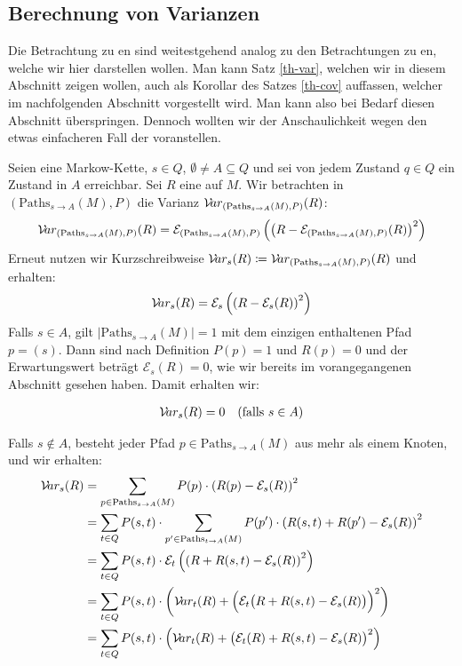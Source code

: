 \documentclass[a4paper]{article}
\newcommand{\mc}{Markow-Kette}
\theoremstyle{nonumberplain}
\begin{document}
\subsection{Berechnung von Varianzen}

Die Betrachtung zu \cov{}en sind weitestgehend analog zu den Betrachtungen zu \var{}en, welche wir hier darstellen wollen. Man kann Satz \ref{th-var}, welchen wir in diesem Abschnitt zeigen wollen, auch als Korollar des Satzes \ref{th-cov} auffassen, welcher im nachfolgenden Abschnitt vorgestellt wird. Man kann also bei Bedarf diesen Abschnitt überspringen. Dennoch wollten wir der Anschaulichkeit wegen den etwas einfacheren Fall der \var{} voranstellen.

Seien \mcex{} eine \mc{}, $s \in Q$, $\emptyset \neq A \subseteq Q$ und  sei von jedem Zustand $q\in Q$ ein Zustand in $A$ erreichbar. Sei $R$ eine  \reward{} auf $M$. Wir betrachten in $(\mathrm{Paths}_{s \rightarrow A}(M), P)$ die Varianz $\mathcal{V}\!ar_{(\mathrm{Paths}_{s \rightarrow A}(M), P)}(R)$:
\begin{equation}
	\mathcal{V}\!ar_{(\mathrm{Paths}_{s \rightarrow A}(M), P)}(R) = \mathcal{E}_{(\mathrm{Paths}_{s \rightarrow A}(M), P)}\left(\left(R - \mathcal{E}_{(\mathrm{Paths}_{s \rightarrow A}(M), P)} (R)\right)^{2}\right) 
\end{equation}
Erneut nutzen wir Kurzschreibweise $\mathcal{V}\!ar_{s}(R) \coloneqq \mathcal{V}\!ar_{(\mathrm{Paths}_{s \rightarrow A}(M), P)}(R)$ und erhalten:
\begin{equation}
\mathcal{V}\!ar_{s}(R) = \mathcal{E}_{s}\left(\left(R - \mathcal{E}_{s} (R)\right)^{2}\right)
\end{equation}
Falls $s \in A$, gilt $|\mathrm{Paths}_{s \rightarrow A}(M)| = 1$ mit dem einzigen enthaltenen Pfad $p = (s)$. Dann sind nach Definition $P(p) = 1$ und $R(p) = 0$ und der Erwartungswert beträgt $\mathcal{E}_{s}(R) = 0$, wie wir bereits im vorangegangenen Abschnitt gesehen haben. Damit erhalten wir:

\begin{align}
\mathcal{V}\!ar_{s}(R) = 0 && \text{(falls $s \in A$)}\label{var_trivial}
\end{align}

Falls $s \notin A$, besteht jeder Pfad $p \in \mathrm{Paths}_{s \rightarrow A}(M)$ aus mehr als einem Knoten, und wir erhalten:
\begin{align}
\mathcal{V}\!ar_{s}(R) & = \sum_{p \in \mathrm{Paths}_{s \rightarrow A}(M)}{P(p) \cdot \left(R(p) - \mathcal{E}_{s}(R)\right)^2} \\
& = \sum_{t \in Q}{ P(s,t) \cdot \sum_{p' \in \mathrm{Paths}_{t \rightarrow A}(M)}{ P(p') \cdot \left(R(s,t) + R(p') - \mathcal{E}_{s}(R)\right)^2 } } \\
& = \sum_{t \in Q}{ P(s,t) \cdot \mathcal{E}_{t}\left(\left(R + R(s,t) - \mathcal{E}_{s}(R)\right)^2\right) } \\
& = \sum_{t \in Q}{ P(s,t) \cdot \bigg(\mathcal{V}\!ar_{t}(R) + \Big(\mathcal{E}_{t}\big(R + R(s,t) - \mathcal{E}_{s}(R)\big)\Big)^2\bigg) } \label{pre-var_recursive} \\
& = \sum_{t \in Q}{ P(s,t) \cdot \Big(\mathcal{V}\!ar_{t}(R) + \big(\mathcal{E}_{t}(R) + R(s,t) - \mathcal{E}_{s}(R)\big)^2\Big) } \label{var_recursive}
\end{align}
\end{document}
